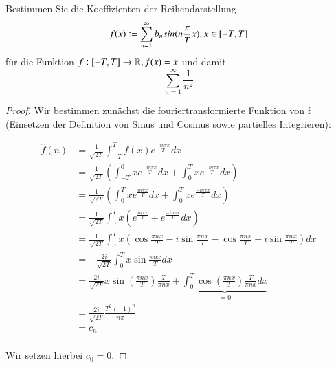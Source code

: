 
\begin{exercise}
	Bestimmen Sie die Koeffizienten der Reihendarstellung 
	\begin{equation*}
		f(x) := \sum_{n=1}^\infty b_n sin(n \frac{\pi}{T} x), x \in [-T, T] \\	
	\end{equation*}
	für die Funktion $f: [-T, T] \to \mathbb{R}, f(x) = x$ und damit
	\begin{equation*}
	\sum_{n=1}^\infty \frac{1}{n^2}
	\end{equation*}
\end{exercise}

\begin{proof}
	Wir bestimmen zunächst die fouriertransformierte Funktion von f (Einsetzen der Definition von Sinus und Cosinus sowie partielles Integrieren):
	
	\begin{equation*}
	\begin{split}
	\hat{f}(n) & = \frac{1}{\sqrt{2T}} \int_{-T}^{T} f(x) e^{\frac{-in\pi x}{T}}dx \\
	& = \frac{1}{\sqrt{2T}} (\int_{-T}^{0} x e^{\frac{-in\pi x}{T}}dx + \int_{0}^{T} x e^{\frac{-in\pi x}{T}}dx) \\
	& = \frac{1}{\sqrt{2T}} (\int_{0}^{T} x e^{\frac{in\pi x}{T}}dx + \int_{0}^{T} x e^{\frac{-in\pi x}{T}}dx) \\
	& = \frac{1}{\sqrt{2T}} \int_{0}^{T} x (e^{\frac{in\pi x}{T}} + e^{\frac{-in\pi x}{T}}dx) \\
	& = \frac{1}{\sqrt{2T}} \int_{0}^{T} x (\cos{\frac{\pi n x}{T}} - i \sin{\frac{\pi n x}{T}} - \cos{\frac{\pi n x}{T}} - i \sin{\frac{\pi n x}{T}})dx \\
	& = -\frac{2i}{\sqrt{2T}} \int_{0}^{T} x \sin{\frac{\pi n x}{T}} dx \\
	& = \frac{2i}{\sqrt{2T}} x \sin{(\frac{\pi n x}{T})} \frac{T}{\pi n x} + \underbrace{\int_{0}^{T} \cos{(\frac{\pi n x}{T})} \frac{T}{\pi n x} dx}_{=0} \\
	& = \frac{2i}{\sqrt{2T}} \frac{T^2 (-1)^n}{n\pi} \\
	& = c_n \\
	\end{split}
	\end{equation*}
	
	Wir setzen hierbei $c_0 = 0$.
	

\end{proof}
